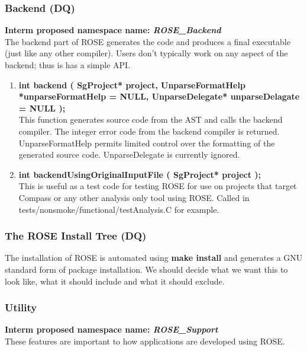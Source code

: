 \subsubsection{Backend (DQ)}
{\bf Interm proposed namespace name: {\em ROSE\_Backend}} \\
   The backend part of ROSE generates the code and produces a final executable
(just like any other compiler).  Users don't typically work on any aspect of 
the backend; thus is has a simple API.
\begin{enumerate}
   \item {\bf int backend ( SgProject* project, UnparseFormatHelp *unparseFormatHelp = NULL, UnparseDelegate* unparseDelagate = NULL );} \\
   This function generates source code from the AST and calls the backend
   compiler. The integer error code from the backend compiler is returned.
   UnparseFormatHelp permits limited control over the formatting of the 
   generated source code. UnparseDelegate is currently ignored.

   \item {\bf int backendUsingOriginalInputFile ( SgProject* project );} \\
   This is useful as a test code for testing ROSE for use on projects that target Compass or any
   other analysis only tool using ROSE. Called in tests/nonsmoke/functional/testAnalysis.C for example.

\end{enumerate}

\subsubsection{The ROSE Install Tree (DQ)}
   The installation of ROSE is automated using {\bf make install}
and generates a GNU standard form of package installation.  
We should decide what we want this to look like, what it should include
and what it should exclude.


\subsubsection{Utility}
{\bf Interm proposed namespace name: {\em ROSE\_Support}} \\
   These features are important to how applications are developed using ROSE.

